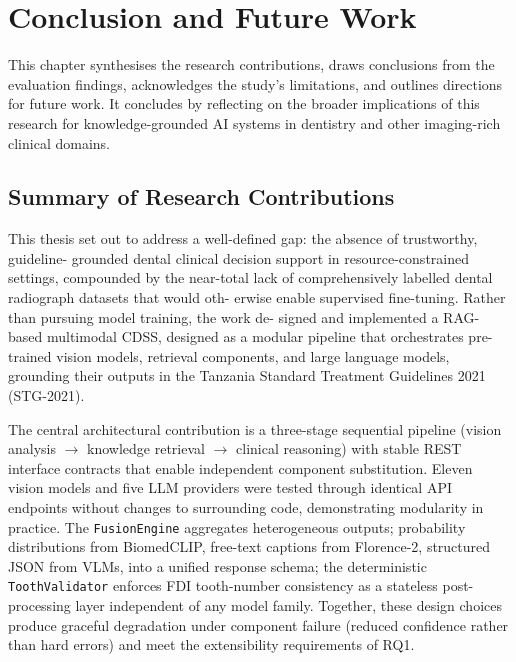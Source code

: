 \documentclass[12pt,a4paper]{report}
\begin{document}
\chapter{Conclusion and Future Work}
\label{chap:conclusion}

This chapter synthesises the research contributions, draws conclusions from
the evaluation findings, acknowledges the study's limitations, and outlines
directions for future work. It concludes by reflecting on the broader
implications of this research for knowledge-grounded AI systems in dentistry
and other imaging-rich clinical domains.

\section{Summary of Research Contributions}
\label{sec:conclusion_contributions}

This thesis set out to address a well-defined gap: the absence of trustworthy, guideline-
grounded dental clinical decision support in resource-constrained settings, compounded by
the near-total lack of comprehensively labelled dental radiograph datasets that would oth-
erwise enable supervised fine-tuning. Rather than pursuing model training, the work de-
signed and implemented a RAG-based multimodal CDSS, designed as a modular pipeline
that orchestrates pre-trained vision models, retrieval components, and large language models,
grounding their outputs in the Tanzania Standard Treatment Guidelines 2021 (STG-2021).

The central architectural contribution is a three-stage sequential pipeline
(vision analysis $\rightarrow$ knowledge retrieval $\rightarrow$ clinical
reasoning) with stable REST interface contracts that enable independent component
substitution. Eleven vision models and five LLM providers were tested through
identical API endpoints without changes to surrounding code, demonstrating
modularity in practice. The \texttt{FusionEngine} aggregates heterogeneous
outputs; probability distributions from BiomedCLIP, free-text captions from
Florence-2, structured JSON from VLMs, into a unified response schema; the
deterministic \texttt{ToothValidator} enforces FDI tooth-number consistency as
a stateless post-processing layer independent of any model family. Together,
these design choices produce graceful degradation under component failure
(reduced confidence rather than hard errors) and meet the extensibility
requirements of RQ1.
\end{document}
